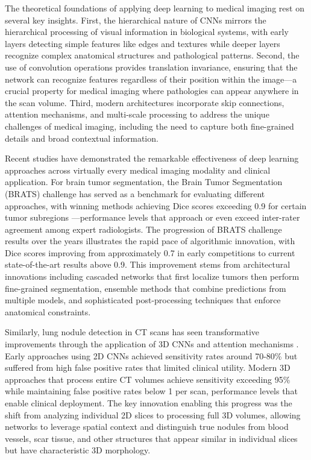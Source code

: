 \documentclass[12pt,a4paper]{article}
\begin{document}
The theoretical foundations of applying deep learning to medical imaging rest on several key insights. First, the hierarchical nature of CNNs mirrors the hierarchical processing of visual information in biological systems, with early layers detecting simple features like edges and textures while deeper layers recognize complex anatomical structures and pathological patterns. Second, the use of convolution operations provides translation invariance, ensuring that the network can recognize features regardless of their position within the image—a crucial property for medical imaging where pathologies can appear anywhere in the scan volume. Third, modern architectures incorporate skip connections, attention mechanisms, and multi-scale processing to address the unique challenges of medical imaging, including the need to capture both fine-grained details and broad contextual information.

Recent studies have demonstrated the remarkable effectiveness of deep learning approaches across virtually every medical imaging modality and clinical application. For brain tumor segmentation, the Brain Tumor Segmentation (BRATS) challenge has served as a benchmark for evaluating different approaches, with winning methods achieving Dice scores exceeding 0.9 for certain tumor subregions \cite{bakas2018advancing}—performance levels that approach or even exceed inter-rater agreement among expert radiologists. The progression of BRATS challenge results over the years illustrates the rapid pace of algorithmic innovation, with Dice scores improving from approximately 0.7 in early competitions to current state-of-the-art results above 0.9. This improvement stems from architectural innovations including cascaded networks that first localize tumors then perform fine-grained segmentation, ensemble methods that combine predictions from multiple models, and sophisticated post-processing techniques that enforce anatomical constraints.

Similarly, lung nodule detection in CT scans has seen transformative improvements through the application of 3D CNNs and attention mechanisms \cite{setio2017validation}. Early approaches using 2D CNNs achieved sensitivity rates around 70-80\% but suffered from high false positive rates that limited clinical utility. Modern 3D approaches that process entire CT volumes achieve sensitivity exceeding 95\% while maintaining false positive rates below 1 per scan, performance levels that enable clinical deployment. The key innovation enabling this progress was the shift from analyzing individual 2D slices to processing full 3D volumes, allowing networks to leverage spatial context and distinguish true nodules from blood vessels, scar tissue, and other structures that appear similar in individual slices but have characteristic 3D morphology.
\end{document}
